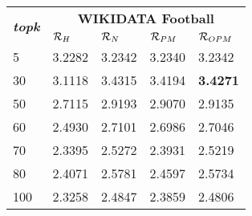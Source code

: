 


%
%
%

\begin{tabular}{|l|llll|}
\hline
       \multirow{2}{*}{\textbf{\textit{topk}}}          & \multicolumn{4}{c|}{\textbf{WIKIDATA Football}}      \\ \cline{2-5} 
 & $\mathcal{R}_{H}$ & $\mathcal{R}_{N}$ & $\mathcal{R}_{PM}$ & $\mathcal{R}_{OPM}$ \\ \hline
5  & 3.2282 & 3.2342 & 3.2340 & 3.2342\\ %
30   & 3.1118 & 3.4315 & 3.4194 & \textbf{3.4271}\\ %
50   & 2.7115 & 2.9193 & 2.9070 & 2.9135\\ %
60   & 2.4930 & 2.7101 & 2.6986 & 2.7046\\ %
70   & 2.3395 & 2.5272 & 2.3931 & 2.5219\\ %
80   & 2.4071 & 2.5781 & 2.4597 & 2.5734\\ %
100   & 2.3258 & 2.4847 & 2.3859 & 2.4806\\ \hline

\end{tabular}

